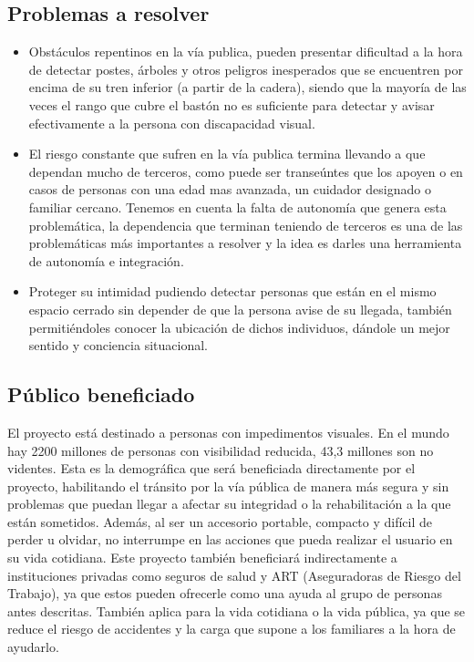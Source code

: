\documentclass[12pt,a4paper]{article}
\begin{document}
\subsection{Problemas a resolver}

\begin{itemize}
\item Obstáculos repentinos en la vía publica, pueden presentar dificultad a la hora de detectar postes, árboles y otros peligros inesperados que se encuentren por encima de su tren inferior (a partir de la cadera), siendo que la mayoría de las veces el rango que cubre el bastón no es suficiente para detectar y avisar efectivamente a la persona con discapacidad visual.
\item El riesgo constante que sufren en la vía publica termina llevando a que dependan mucho de terceros, como puede ser transeúntes que los apoyen o en casos de personas con una edad mas avanzada, un cuidador designado o familiar cercano. Tenemos en cuenta la falta de autonomía que genera esta problemática, la dependencia que terminan teniendo de terceros es una de las problemáticas más importantes a resolver y la idea es darles una herramienta de autonomía e integración.
\item Proteger su intimidad pudiendo detectar personas que están en el mismo espacio cerrado sin depender de que la persona avise de su llegada, también permitiéndoles conocer la ubicación de dichos individuos, dándole un mejor sentido y conciencia situacional.
\end{itemize}

\subsection{Público beneficiado}
El proyecto está destinado a personas con impedimentos visuales. En el mundo hay 2200 millones de personas con visibilidad reducida, 43,3 millones son no videntes. Esta es la demográfica que será beneficiada directamente por el proyecto, habilitando el tránsito por la vía pública de manera más segura y sin problemas que puedan llegar a afectar su integridad o la rehabilitación a la que están sometidos. Además, al ser un accesorio portable, compacto y difícil de perder u olvidar, no interrumpe en las acciones que pueda realizar el usuario en su vida cotidiana. Este proyecto también beneficiará indirectamente a instituciones privadas como seguros de salud y ART (Aseguradoras de Riesgo del Trabajo), ya que estos pueden ofrecerle como una ayuda al grupo de personas antes descritas. También aplica para la vida cotidiana o la vida pública, ya que se reduce el riesgo de accidentes y la carga que supone a los familiares a la hora de ayudarlo.
\end{document}
